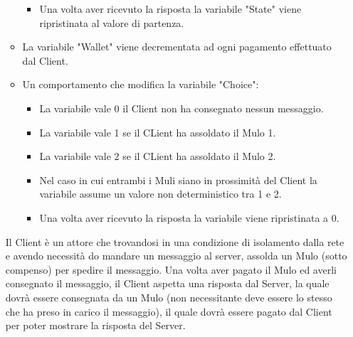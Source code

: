 \documentclass[13pt,a4paper]{article}
\begin{document}
\begin{itemize}
\begin{itemize}
\begin{itemize}
							\item Una volta aver ricevuto la risposta la variabile "State" viene ripristinata al valore di partenza.
							\end{itemize}
						\item La variabile "Wallet" viene decrementata ad ogni pagamento effettuato dal Client.
						\item Un comportamento che modifica la variabile "Choice":
						\begin{itemize}
							\item La variabile vale 0 il Client non ha consegnato nessun messaggio.
							\item La variabile vale 1 se  il CLient ha assoldato il Mulo 1.
							\item La variabile vale 2 se  il CLient ha assoldato il Mulo 2.
							\item Nel caso in cui entrambi i Muli siano in prossimità del Client la variabile assume un valore non deterministico tra 1 e 2.
							\item Una volta aver ricevuto la risposta la variabile viene ripristinata a 0.
						\end{itemize}
					\end{itemize}
				Il Client  è un attore che trovandosi in una condizione di isolamento dalla rete e avendo necessità do mandare un messaggio al server, assolda un Mulo (sotto compenso) per spedire il messaggio. Una volta aver pagato il Mulo ed averli consegnato il messaggio, il Client aspetta una risposta dal Server, la quale dovrà essere consegnata da un Mulo (non necessitante deve essere lo stesso che ha preso in carico il messaggio), il quale dovrà essere pagato dal Client per poter mostrare la risposta del Server.
				

\end{itemize}
\end{document}
